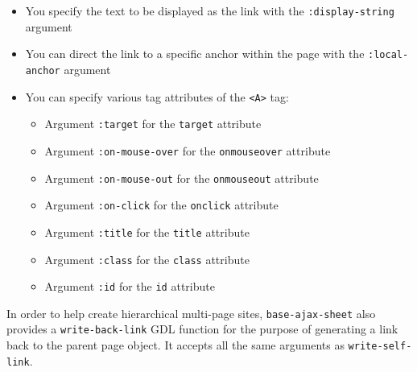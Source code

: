 \documentclass [11pt]{book}
\begin{document}
\begin{itemize}

\item You specify the text to be displayed as the link with the \texttt{:display-string} argument

\item You can direct the link to a specific anchor within the page with the \texttt{:local-anchor} argument

\item You can specify various tag attributes of the \texttt{<A>} tag:

\begin{itemize}

\item Argument \texttt{:target} for the \texttt{target} attribute

\item Argument \texttt{:on-mouse-over} for the \texttt{onmouseover} attribute

\item Argument \texttt{:on-mouse-out} for the \texttt{onmouseout} attribute

\item Argument \texttt{:on-click} for the \texttt{onclick} attribute

\item Argument \texttt{:title} for the \texttt{title} attribute

\item Argument \texttt{:class} for the \texttt{class} attribute

\item Argument \texttt{:id} for the \texttt{id} attribute

\end{itemize}



\end{itemize}





In order to help create hierarchical multi-page sites, \texttt{base-ajax-sheet} also provides
a \texttt{write-back-link} GDL function for the purpose of generating a link back to the parent page object.
It accepts all the same arguments as \texttt{write-self-link}.
\end{document}
